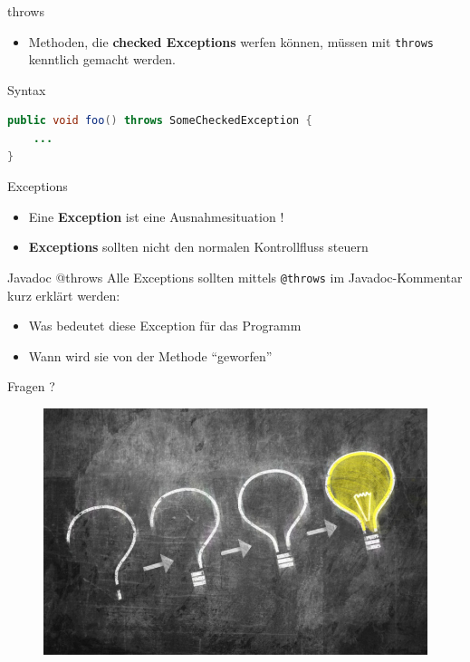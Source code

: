 \documentclass[18pt]{beamer}
\newcommand{\quotes}[1]{``#1''}
\begin{document}
\begin{frame}[fragile]{throws}

    \begin{itemize}
        \item Methoden, die \textbf{checked Exceptions} werfen können, müssen mit \texttt{throws} kenntlich gemacht werden.
    \end{itemize}


    \begin{exampleblock}{Syntax}
        \begin{lstlisting}[language=Java,basicstyle=\scriptsize]
public void foo() throws SomeCheckedException {
    ...
}
        \end{lstlisting}

    \end{exampleblock}

\end{frame}

\begin{frame}{Exceptions}
    \begin{itemize}
        \item Eine \textbf{Exception} ist eine \alert{Ausnahmesituation !}
        \item \textbf{Exceptions} sollten nicht den normalen Kontrollfluss steuern
    \end{itemize}
\end{frame}

\begin{frame}{Javadoc @throws}
    Alle Exceptions sollten mittels \texttt{@throws} im Javadoc-Kommentar kurz erklärt werden:
    \begin{itemize}
        \item Was bedeutet diese Exception für das Programm
        \item Wann wird sie von der Methode \quotes{geworfen}
    \end{itemize}
\end{frame}


\begin{frame}{Fragen ?}
    \begin{figure}
        \includegraphics[scale=.5]{img/question_to_idea.jpg}
    \end{figure}
\end{frame}
\end{document}
